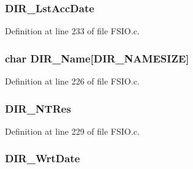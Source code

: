 \subsubsection[{D\+I\+R\+\_\+\+Lst\+Acc\+Date}]{ D\+I\+R\+\_\+\+Lst\+Acc\+Date}\label{struct___d_i_r_e_n_t_r_y_a122788ca7738b059f3eb21b52b17b96c}


Definition at line 233 of file F\+S\+I\+O.\+c.

\hypertarget{struct___d_i_r_e_n_t_r_y_a25902ff47f9dd1672c00655fdf823a1e}{}
\subsubsection[{D\+I\+R\+\_\+\+Name}]{\setlength{\rightskip}{0pt plus 5cm}char D\+I\+R\+\_\+\+Name\mbox{[}{\bf D\+I\+R\+\_\+\+N\+A\+M\+E\+S\+I\+Z\+E}\mbox{]}}\label{struct___d_i_r_e_n_t_r_y_a25902ff47f9dd1672c00655fdf823a1e}


Definition at line 226 of file F\+S\+I\+O.\+c.

\hypertarget{struct___d_i_r_e_n_t_r_y_af8459a5d4b4d16f55fed52d6e964a426}{}
\subsubsection[{D\+I\+R\+\_\+\+N\+T\+Res}]{ D\+I\+R\+\_\+\+N\+T\+Res}\label{struct___d_i_r_e_n_t_r_y_af8459a5d4b4d16f55fed52d6e964a426}


Definition at line 229 of file F\+S\+I\+O.\+c.

\hypertarget{struct___d_i_r_e_n_t_r_y_a8c46e5fb2ff2549802ed0b2c98f9d074}{}
\subsubsection[{D\+I\+R\+\_\+\+Wrt\+Date}]{ D\+I\+R\+\_\+\+Wrt\+Date}\label{struct___d_i_r_e_n_t_r_y_a8c46e5fb2ff2549802ed0b2c98f9d074}


